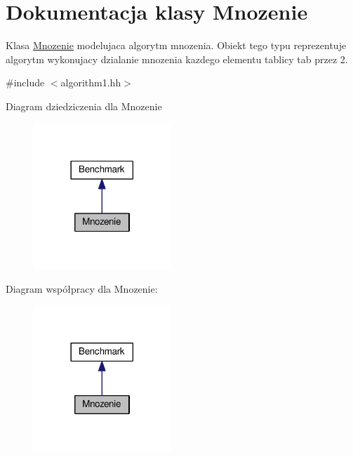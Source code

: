 \hypertarget{class_mnozenie}{\section{Dokumentacja klasy Mnozenie}
\label{class_mnozenie}
}


Klasa \hyperlink{class_mnozenie}{Mnozenie} modelujaca algorytm mnozenia. Obiekt tego typu reprezentuje algorytm wykonujacy dzialanie mnozenia kazdego elementu tablicy tab przez 2.  




{\ttfamily \#include $<$algorithm1.\-hh$>$}



Diagram dziedziczenia dla Mnozenie\nopagebreak
\begin{figure}[H]
\begin{center}
\leavevmode
\includegraphics[width=146pt]{class_mnozenie__inherit__graph}
\end{center}
\end{figure}


Diagram współpracy dla Mnozenie\-:\nopagebreak
\begin{figure}[H]
\begin{center}
\leavevmode
\includegraphics[width=146pt]{class_mnozenie__coll__graph}
\end{center}
\end{figure}
